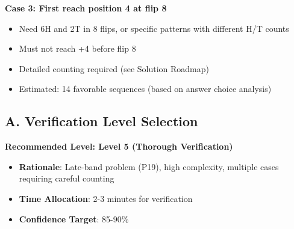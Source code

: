 \documentclass[]{article}
\begin{document}
\textbf{Case 3: First reach position 4 at flip 8}
\begin{itemize}
    \item Need 6H and 2T in 8 flips, or specific patterns with different H/T counts
    \item Must not reach +4 before flip 8
    \item Detailed counting required (see Solution Roadmap)
    \item Estimated: 14 favorable sequences (based on answer choice analysis)
\end{itemize}

\begin{verificationbox}
\subsection*{A. Verification Level Selection}
\textbf{Recommended Level: Level 5 (Thorough Verification)}
\begin{itemize}[leftmargin=*]
    \item \textbf{Rationale}: Late-band problem (P19), high complexity, multiple cases requiring careful counting
    \item \textbf{Time Allocation}: 2-3 minutes for verification
    \item \textbf{Confidence Target}: 85-90\%
\end{itemize}


\end{verificationbox}
\end{document}
